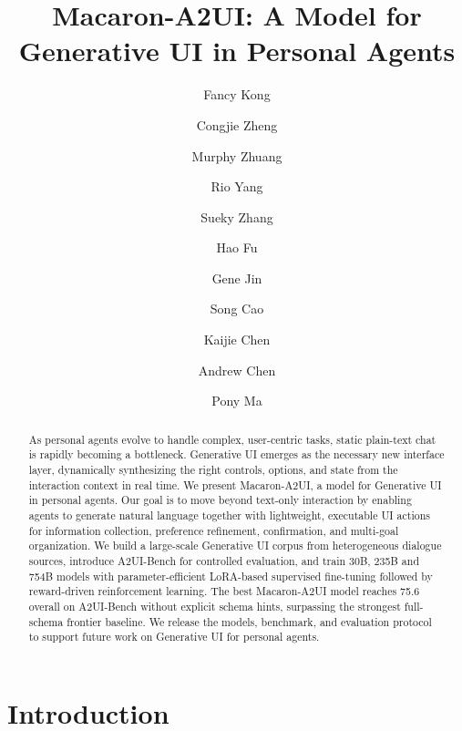 \documentclass{llmxive}
\title{Macaron-A2UI: A Model for Generative UI in Personal Agents}
\author{Fancy Kong \and Congjie Zheng \and Murphy Zhuang \and Rio Yang \and Sueky Zhang \and Hao Fu \and Gene Jin \and Song Cao \and Kaijie Chen \and Andrew Chen \and Pony Ma}
\begin{document}
\maketitle
\begin{abstract}
As personal agents evolve to handle complex, user-centric tasks, static plain-text chat is rapidly becoming a bottleneck. Generative UI emerges as the necessary new interface layer, dynamically synthesizing the right controls, options, and state from the interaction context in real time. We present Macaron-A2UI, a model for Generative UI in personal agents. Our goal is to move beyond text-only interaction by enabling agents to generate natural language together with lightweight, executable UI actions for information collection, preference refinement, confirmation, and multi-goal organization. We build a large-scale Generative UI corpus from heterogeneous dialogue sources, introduce A2UI-Bench for controlled evaluation, and train 30B, 235B and 754B models with parameter-efficient LoRA-based supervised fine-tuning followed by reward-driven reinforcement learning. 
The best Macaron-A2UI model reaches 75.6 overall on A2UI-Bench without explicit schema hints, surpassing the strongest full-schema frontier baseline. We release the models, benchmark, and evaluation protocol to support future work on Generative UI for personal agents.
\end{abstract}
\section{Introduction}



\end{document}
